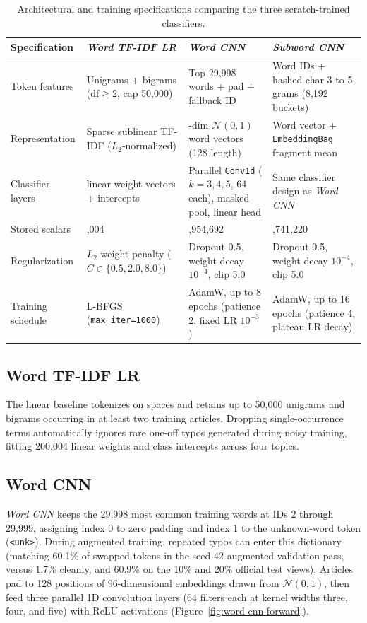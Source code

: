 \begin{table}[H]
\centering\small\setlength{\tabcolsep}{4pt}
\begin{tabularx}{\linewidth}{@{}>{\raggedright\arraybackslash}p{29mm}>{\raggedright\arraybackslash}p{38mm}>{\raggedright\arraybackslash}p{38mm}>{\raggedright\arraybackslash}X@{}}
\toprule
Specification & \textit{Word TF-IDF LR} & \textit{Word CNN} & \textit{Subword CNN} \\
\midrule
Token features & Unigrams + bigrams ($\mathrm{df} \ge 2$, cap 50,000) & Top 29,998 words + pad + fallback ID & Word IDs + hashed char 3 to 5-grams (8,192 buckets) \\
Representation & Sparse sublinear TF-IDF ($L_2$-normalized) & 96-dim $\mathcal{N}(0,1)$ word vectors (128 length) & Word vector + \texttt{EmbeddingBag} fragment mean \\
Classifier layers & 4 linear weight vectors + intercepts & Parallel \texttt{Conv1d} ($k=3,4,5$, 64 each), masked pool, linear head & Same classifier design as \textit{Word CNN} \\
Stored scalars & 200,004 & 2,954,692 & 3,741,220 \\
Regularization & $L_2$ weight penalty ($C \in \{0.5, 2.0, 8.0\}$) & Dropout 0.5, weight decay $10^{-4}$, clip 5.0 & Dropout 0.5, weight decay $10^{-4}$, clip 5.0 \\
Training schedule & L-BFGS (\texttt{max\_iter=1000}) & AdamW, up to 8 epochs (patience 2, fixed LR $10^{-3}$) & AdamW, up to 16 epochs (patience 4, plateau LR decay) \\
\bottomrule
\end{tabularx}
\caption[Primary model technical specifications]{Architectural and training specifications comparing the three scratch-trained classifiers.}
\label{tab:model-tech-summary}
\end{table}

\subsection{Word TF-IDF LR}
The linear baseline tokenizes on spaces and retains up to 50,000 unigrams and bigrams occurring in at least two training articles. Dropping single-occurrence terms automatically ignores rare one-off typos generated during noisy training, fitting 200,004 linear weights and class intercepts across four topics.

\subsection{Word CNN}
\textit{Word CNN} keeps the 29,998 most common training words at IDs 2 through 29,999, assigning index 0 to zero padding and index 1 to the unknown-word token (\texttt{<unk>}). During augmented training, repeated typos can enter this dictionary (matching 60.1\% of swapped tokens in the seed-42 augmented validation pass, versus 1.7\% cleanly, and 60.9\% on the 10\% and 20\% official test views). Articles pad to 128 positions of 96-dimensional embeddings drawn from $\mathcal{N}(0,1)$, then feed three parallel 1D convolution layers (64 filters each at kernel widths three, four, and five) with ReLU activations (Figure~\ref{fig:word-cnn-forward}).

